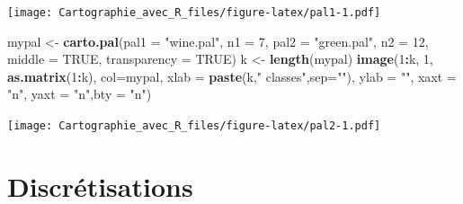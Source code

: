 \documentclass[]{book}
\newenvironment{Shaded}{\begin{snugshade}}{\end{snugshade}}
\newcommand{\KeywordTok}[1]{\textcolor[rgb]{0.13,0.29,0.53}{\textbf{#1}}}
\newcommand{\DataTypeTok}[1]{\textcolor[rgb]{0.13,0.29,0.53}{#1}}
\newcommand{\DecValTok}[1]{\textcolor[rgb]{0.00,0.00,0.81}{#1}}
\newcommand{\StringTok}[1]{\textcolor[rgb]{0.31,0.60,0.02}{#1}}
\newcommand{\CommentTok}[1]{\textcolor[rgb]{0.56,0.35,0.01}{\textit{#1}}}
\newcommand{\OtherTok}[1]{\textcolor[rgb]{0.56,0.35,0.01}{#1}}
\newcommand{\OperatorTok}[1]{\textcolor[rgb]{0.81,0.36,0.00}{\textbf{#1}}}
\newcommand{\NormalTok}[1]{#1}
\begin{document}
\texttt{[image: Cartographie\_avec\_R\_files/figure-latex/pal1-1.pdf]}

\begin{Shaded}
\begin{Highlighting}[]
\NormalTok{mypal <-}\StringTok{ }\KeywordTok{carto.pal}\NormalTok{(}\DataTypeTok{pal1 =} \StringTok{"wine.pal"}\NormalTok{, }\DataTypeTok{n1 =} \DecValTok{7}\NormalTok{, }\DataTypeTok{pal2 =} \StringTok{"green.pal"}\NormalTok{, }\DataTypeTok{n2 =} \DecValTok{12}\NormalTok{,}
                   \DataTypeTok{middle =} \OtherTok{TRUE}\NormalTok{, }\DataTypeTok{transparency =} \OtherTok{TRUE}\NormalTok{)}
\NormalTok{k <-}\StringTok{ }\KeywordTok{length}\NormalTok{(mypal)}
\KeywordTok{image}\NormalTok{(}\DecValTok{1}\OperatorTok{:}\NormalTok{k, }\DecValTok{1}\NormalTok{, }\KeywordTok{as.matrix}\NormalTok{(}\DecValTok{1}\OperatorTok{:}\NormalTok{k), }\DataTypeTok{col=}\NormalTok{mypal, }\DataTypeTok{xlab =} \KeywordTok{paste}\NormalTok{(k,}\StringTok{" classes"}\NormalTok{,}\DataTypeTok{sep=}\StringTok{""}\NormalTok{),}
      \DataTypeTok{ylab =} \StringTok{""}\NormalTok{, }\DataTypeTok{xaxt =} \StringTok{"n"}\NormalTok{, }\DataTypeTok{yaxt =} \StringTok{"n"}\NormalTok{,}\DataTypeTok{bty =} \StringTok{"n"}\NormalTok{)}
\end{Highlighting}
\end{Shaded}

\texttt{[image: Cartographie\_avec\_R\_files/figure-latex/pal2-1.pdf]}

\section{Discrétisations}\label{discretisations}

\begin{Shaded}
\end{Shaded}
\end{document}
